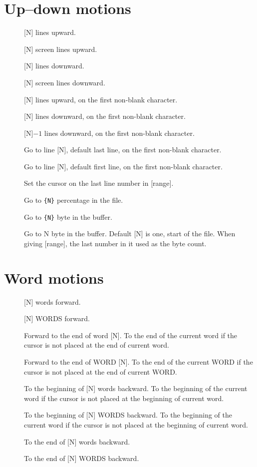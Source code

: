 \section{Up--down motions}
\begin{description}
  \item[] [N] lines upward.
  \item[] [N] screen lines upward.
  \item[] [N] lines downward.
  \item[] [N] screen lines downward.
  \item[\syntax{[N]-}] [N] lines upward, on the first non-blank character.
  \item[\syntax{[N]+}] [N] lines downward, on the first non-blank character.
  \item[\syntax{[N]_}] [N]$-1$ lines downward, on the first non-blank character.
  \item[] Go to line [N], default last line, on the first non-blank character.
  \item[] Go to line [N], default first line, on the first non-blank character.
  \item[\syntax{:[range]}] Set the cursor on the last line number in [range].
  \item[] Go to \verb|{N}| percentage in the file.
  \item[] Go to \verb|{N}| byte in the buffer.
  \item[] Go to {N} byte in the buffer.  Default [N] is one, start of the file.  When giving [range], the last number in it used as the byte count.
\end{description}
\section{Word motions}
\begin{description}
  \item[] [N] words forward.
  \item[] [N] WORDS forward.
  \item[] Forward to the end of word [N]. To the end of the current word if the cursor is not placed at the end of current word.
  \item[] Forward to the end of WORD [N]. To the end of the current WORD if the cursor is not placed at the end of current WORD.
  \item[] To the beginning of [N] words backward. To the beginning of the current word if the cursor is not placed at the beginning of current word.
  \item[] To the beginning of [N] WORDS backward. To the beginning of the current word if the cursor is not placed at the beginning of current word.
  \item[] To the end of [N] words backward.
  \item[] To the end of [N] WORDS backward.
\end{description}
